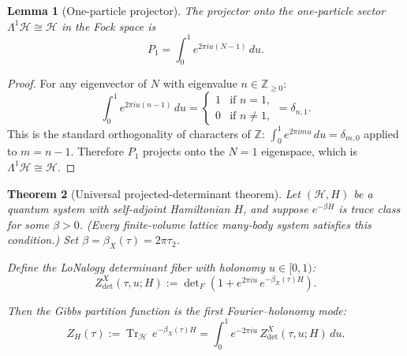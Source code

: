 \documentclass[12pt]{article}
\theoremstyle{plain}
\newtheorem{theorem}{Theorem}[section]
\newtheorem{lemma}[theorem]{Lemma}
\theoremstyle{definition}
\numberwithin{equation}{section}
\newcommand{\Z}{\mathbb{Z}}
\DeclareMathOperator{\Tr}{Tr}
\begin{document}
\begin{lemma}[One-particle projector]\label{lem:projector}
The projector onto the one-particle sector $\Lambda^1\mathcal{H}\cong\mathcal{H}$
in the Fock space is
\begin{equation}\label{eq:projector}
P_1 = \int_0^1 e^{2\pi iu(N-1)}\,du.
\end{equation}
\end{lemma}

\begin{proof}
For any eigenvector of $N$ with eigenvalue $n\in\Z_{\geq 0}$:
\begin{equation}
\int_0^1 e^{2\pi iu(n-1)}\,du
= \begin{cases}1 & \text{if }n=1,\\0&\text{if }n\neq 1,\end{cases}
= \delta_{n,1}.
\end{equation}
This is the standard orthogonality of characters of $\Z$:
$\int_0^1 e^{2\pi imu}\,du=\delta_{m,0}$ applied to $m=n-1$.
Therefore $P_1$ projects onto the $N=1$ eigenspace, which is
$\Lambda^1\mathcal{H}\cong\mathcal{H}$.
\end{proof}

\begin{theorem}[Universal projected-determinant theorem]\label{thm:universal}
Let $(\mathcal{H},H)$ be a quantum system with self-adjoint
Hamiltonian $H$, and suppose $e^{-\beta H}$ is trace class for some
$\beta>0$.  (Every finite-volume lattice many-body system satisfies
this condition.)  Set $\beta=\beta_X(\tau)=2\pi\tau_2$.

Define the LoNalogy determinant fiber with holonomy $u\in[0,1)$:
\begin{equation}\label{eq:detbundle}
Z_{\det}^X(\tau,u;H)
:= \det\nolimits_F\!\left(1+e^{2\pi iu}\,e^{-\beta_X(\tau)H}\right).
\end{equation}

Then the Gibbs partition function is the first Fourier--holonomy mode:
\begin{equation}\label{eq:universalthm}
\boxed{Z_H(\tau)
:= \Tr_{\mathcal{H}}\,e^{-\beta_X(\tau)H}
= \int_0^1 e^{-2\pi iu}\,Z_{\det}^X(\tau,u;H)\,du.}
\end{equation}
\end{theorem}
\end{document}
